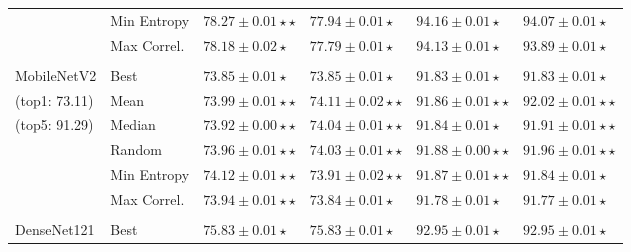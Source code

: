 \documentclass{elsarticle}
\begin{document}
\begin{table}[h!]
\begin{tabularx}{\textwidth}{XX|YY|YY}
		                               & Min Entropy              & $\mathbf{78.27\pm0.01\star\star}$    & $77.94\pm0.01\star$                  & $94.16\pm0.01\star$                 & $94.07\pm0.01\star$                 \\
		                               & Max Correl.              & $78.18\pm 0.02\star$                 & $77.79\pm0.01\star$                  & $94.13\pm0.01\star$                 & $93.89\pm0.01\star$                 \\
		                               &                          &                                      &                                      &                                     &                                     \\
		{ MobileNetV2}                 & Best                     & $73.85 \pm 0.01 \star$               & $73.85 \pm 0.01 \star$               & $91.83 \pm 0.01\star$               & $91.83 \pm 0.01\star$               \\
		(top1: 73.11)                    & Mean                     & $73.99 \pm 0.01 \star\star$          & $\mathbf{74.11 \pm 0.02} \star\star$ & $91.86 \pm 0.01\star\star$          & $\mathbf{92.02 \pm 0.01\star\star}$ \\
		(top5: 91.29)                    & Median                   & $73.92 \pm 0.00\star\star $          & $74.04 \pm 0.01 \star\star$          & $91.84 \pm 0.01\star$               & $91.91 \pm 0.01\star\star$          \\
		                               & Random                   & $73.96 \pm 0.01 \star\star$          & $74.03 \pm 0.01\star\star$           & $\mathbf{91.88 \pm 0.00\star\star}$ & $91.96 \pm 0.01\star\star$          \\
		                               & Min Entropy              & $\mathbf{74.12\pm0.01\star\star}$    & $73.91\pm0.02\star\star$             & $91.87\pm0.01\star\star$            & $91.84\pm0.01\star$                 \\
		                               & Max Correl.              & $73.94\pm0.01\star\star$             & $73.84\pm0.01\star$                  & $91.78\pm0.01\star$                 & $91.77\pm0.01\star$                 \\
		                               &                          &                                      &                                      &                                     &                                     \\
		{ DenseNet121}                 & Best                     & $ 75.83 \pm 0.01 \star$              & $ 75.83 \pm 0.01 \star$              & $92.95 \pm 0.01\star$               & $92.95 \pm 0.01 \star$              \\

\end{tabularx}
\end{table}
\end{document}
